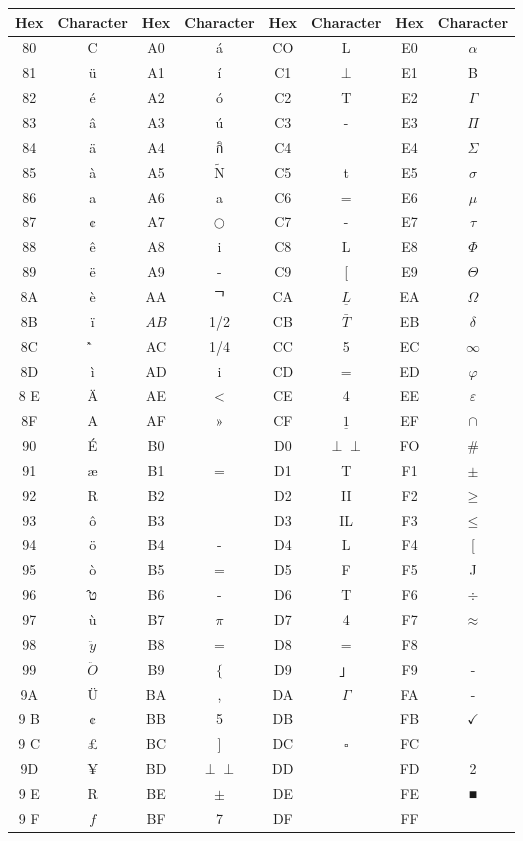 \documentclass[10pt]{book}
\def\Perp{\perp\!\!\!\perp}
\begin{document}
\begin{center}
\begin{tabular}{|c|c|c|c|c|c|c|c|}
\hline
Hex & Character & Hex & Character & Hex & Character & Hex & Character \\
\hline
80 & C & A0 & á & CO & L & E0 & $\alpha$ \\
\hline
81 & ü & A1 & í & C1 & $\perp$ & E1 & B \\
\hline
82 & é & A2 & ó & C2 & T & E2 & $\Gamma$ \\
\hline
83 & â & A3 & ú & C3 & - & E3 & $\Pi$ \\
\hline
84 & ä & A4 & กิ & C4 &  & E4 & $\Sigma$ \\
\hline
85 & à & A5 & $\tilde{\mathrm{N}}$ & C5 & t & E5 & $\sigma$ \\
\hline
86 & a & A6 & a & C6 & $=$ & E6 & $\mu$ \\
\hline
87 & ¢ & A7 & $\bigcirc$ & C7 & - & E7 & $\tau$ \\
\hline
88 & ê & A8 & i & C8 & L & E8 & $\Phi$ \\
\hline
89 & ë & A9 & - & C9 & [ & E9 & $\Theta$ \\
\hline
8A & è & AA & ᄀ & CA & $\underline{L}$ & EA & $\Omega$ \\
\hline
8B & ï & $A B$ & 1/2 & CB & $\bar{T}$ & EB & $\delta$ \\
\hline
8C & ̂̀ & AC & 1/4 & CC & 5 & EC & $\infty$ \\
\hline
8D & ì & AD & i & CD & $=$ & ED & $\varphi$ \\
\hline
8 E & Ä & AE & < & CE & 4 & EE & $\varepsilon$ \\
\hline
8F & A & AF & » & CF & $\underline{1}$ & EF & $\cap$ \\
\hline
90 & É & B0 &  & D0 & $\Perp$ & FO & \# \\
\hline
91 & æ & B1 & = & D1 & T & F1 & $\pm$ \\
\hline
92 & R & B2 &  & D2 & II & F2 & $\geq$ \\
\hline
93 & ô & B3 &  & D3 & IL & F3 & $\leq$ \\
\hline
94 & ö & B4 & - & D4 & L & F4 & [ \\
\hline
95 & ò & B5 & $=$ & D5 & F & F5 & J \\
\hline
96 & ט̂ & B6 & - & D6 & T & F6 & $\div$ \\
\hline
97 & ù & B7 & $\pi$ & D7 & 4 & F7 & $\approx$ \\
\hline
98 & $\ddot{y}$ & B8 & $=$ & D8 & = & F8 &  \\
\hline
99 & $\ddot{O}$ & B9 & $\{$ & D9 & 」 & F9 & - \\
\hline
9A & Ü & BA & , & DA & $\Gamma$ & FA & - \\
\hline
9 B & ¢ & BB & 5 & DB &  & FB & $\checkmark$ \\
\hline
9 C & £ & BC & ] & DC & $\square$ & FC &  \\
\hline
9D & ¥ & BD & $\Perp$ & DD &  & FD & 2 \\
\hline
9 E & R & BE & $\pm$ & DE &  & FE & ■ \\
\hline
9 F & $f$ & BF & 7 & DF &  & FF &  \\
\hline
\end{tabular}
\end{center}
\end{document}

